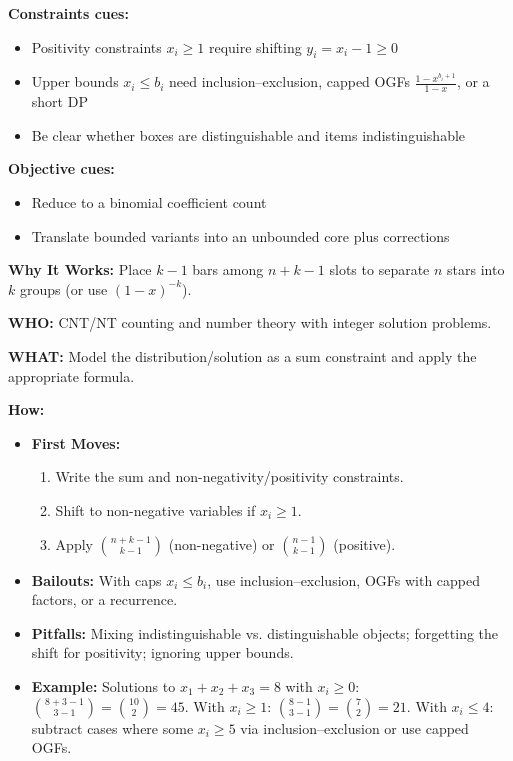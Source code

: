 \documentclass[12pt]{article}
\begin{document}
\textbf{Constraints cues:}
\begin{itemize}
    \item Positivity constraints $x_i \ge 1$ require shifting $y_i = x_i - 1 \ge 0$
    \item Upper bounds $x_i \le b_i$ need inclusion\mbox{--}exclusion, capped OGFs $\tfrac{1-x^{b_i+1}}{1-x}$, or a short DP
    \item Be clear whether boxes are distinguishable and items indistinguishable
\end{itemize}

\textbf{Objective cues:}
\begin{itemize}
    \item Reduce to a binomial coefficient count
    \item Translate bounded variants into an unbounded core plus corrections
\end{itemize}

\textbf{Why It Works:} Place $k-1$ bars among $n+k-1$ slots to separate $n$ stars into $k$ groups (or use $(1-x)^{-k}$).

\textbf{WHO:} CNT/NT counting and number theory with integer solution problems.

\textbf{WHAT:} Model the distribution/solution as a sum constraint and apply the appropriate formula.


\textbf{How:}
\begin{itemize}
    \item \textbf{First Moves:}
    \begin{enumerate}[nosep]
        \item Write the sum and non\mbox{-}negativity/positivity constraints.
        \item Shift to non\mbox{-}negative variables if $x_i \ge 1$.
        \item Apply $\binom{n+k-1}{k-1}$ (non\mbox{-}negative) or $\binom{n-1}{k-1}$ (positive).
    \end{enumerate}
    \item \textbf{Bailouts:} With caps $x_i \le b_i$, use inclusion\mbox{--}exclusion, OGFs with capped factors, or a recurrence.
    \item \textbf{Pitfalls:} Mixing indistinguishable vs. distinguishable objects; forgetting the shift for positivity; ignoring upper bounds.
    \item \textbf{Example:} Solutions to $x_1+x_2+x_3=8$ with $x_i \ge 0$:
    $\binom{8+3-1}{3-1}=\binom{10}{2}=45$. With $x_i \ge 1$: $\binom{8-1}{3-1}=\binom{7}{2}=21$. With $x_i \le 4$: subtract cases where some $x_i\ge 5$ via inclusion\mbox{--}exclusion or use capped OGFs.
\end{itemize}
\end{document}
